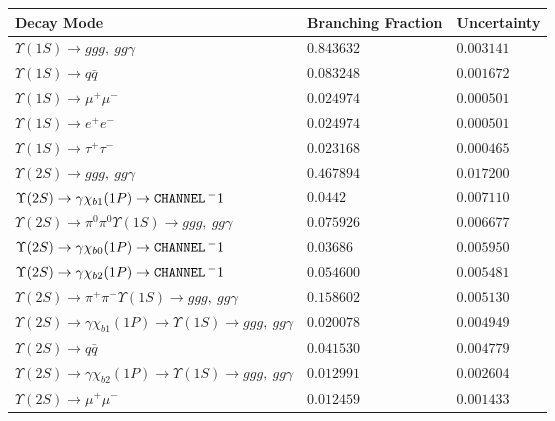 \documentclass[12pt]{article}
\begin{document}
\hspace{-1.3in} \vspace{-1.4in}
\begin{tabular}{p{4.7in} l l}
Decay Mode & Branching Fraction & Uncertainty \\ \hline
$   \Upsilon(1S) \to ggg,\ gg\gamma   $ & $   0.843632     $ & $   0.003141    $ \\ 
$   \Upsilon(1S) \to q\bar{q}        $ & $   0.083248     $ & $   0.001672   $ \\ 
$   \Upsilon(1S) \to \mu^+ \mu^-     $ & $   0.024974    $ & $   0.000501   $ \\ 
$   \Upsilon(1S) \to e^+ e^-         $ & $   0.024974    $ & $   0.000501   $ \\ 
$   \Upsilon(1S) \to \tau^+ \tau^-   $ & $   0.023168   $ & $   0.000465   $ \\ \hline
$   \Upsilon(2S) \to ggg,\ gg\gamma                                             $ & $   0.467894        $ & $   0.017200       $ \\ 
$   \Upsilon(2S) \to \gamma \chi_{b1}(1P) \to {\tt \small CHANNEL} \, ^-1                 $ & $   0.0442                    $ & $   0.007110      $ \\ 
$   \Upsilon(2S) \to \pi^0 \pi^0 \Upsilon(1S) \to ggg,\ gg\gamma                $ & $   0.075926       $ & $   0.006677      $ \\ 
$   \Upsilon(2S) \to \gamma \chi_{b0}(1P) \to {\tt \small CHANNEL} \, ^-1                 $ & $   0.03686                   $ & $   0.005950      $ \\ 
$   \Upsilon(2S) \to \gamma \chi_{b2}(1P) \to {\tt \small CHANNEL} \, ^-1                 $ & $   0.054600       $ & $   0.005481      $ \\ 
$   \Upsilon(2S) \to \pi^+ \pi^- \Upsilon(1S) \to ggg,\ gg\gamma                $ & $   0.158602       $ & $   0.005130      $ \\ 
$   \Upsilon(2S) \to \gamma \chi_{b1}(1P) \to \Upsilon(1S) \to ggg,\ gg\gamma   $ & $   0.020078      $ & $   0.004949      $ \\ 
$   \Upsilon(2S) \to q\bar{q}                                                  $ & $   0.041530       $ & $   0.004779      $ \\ 
$   \Upsilon(2S) \to \gamma \chi_{b2}(1P) \to \Upsilon(1S) \to ggg,\ gg\gamma   $ & $   0.012991      $ & $   0.002604      $ \\ 
$   \Upsilon(2S) \to \mu^+ \mu^-                                               $ & $   0.012459       $ & $   0.001433     $ \\ 

\end{tabular}
\end{document}
